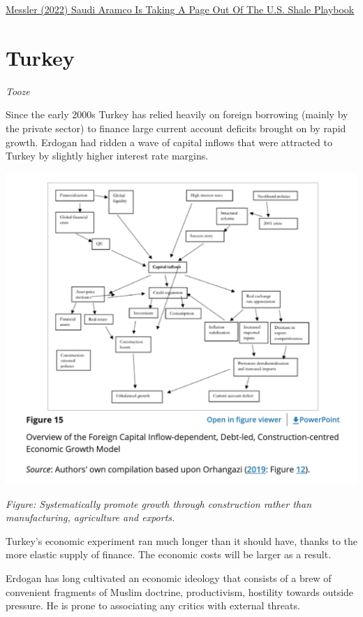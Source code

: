 \documentclass[
]{book}
\begin{document}
\href{https://oilprice.com/Energy/Crude-Oil/Saudi-Aramco-Is-Taking-A-Page-Out-Of-The-US-Shale-Playbook.html}{Messler (2022) Saudi Aramco Is Taking A Page Out Of The U.S. Shale Playbook}

\hypertarget{turkey}{%
\section{Turkey}\label{turkey}}

\emph{Tooze}

Since the early 2000s Turkey has relied heavily on foreign borrowing (mainly by the private sector) to finance large current account deficits brought on by rapid growth.
Erdogan had ridden a wave of capital inflows that were attracted to Turkey by slightly higher interest rate margins.

\includegraphics{fig/turkey_model.png}

\emph{Figure: Systematically promote growth through construction rather than manufacturing, agriculture and exports.}

Turkey's economic experiment ran much longer than it should have, thanks to the more elastic supply of finance. The economic costs will be larger as a result.

Erdogan has long cultivated an economic ideology that consists of a brew of convenient fragments of Muslim doctrine, productivism, hostility towards outside pressure. He is prone to associating any critics with external threats.
\end{document}
